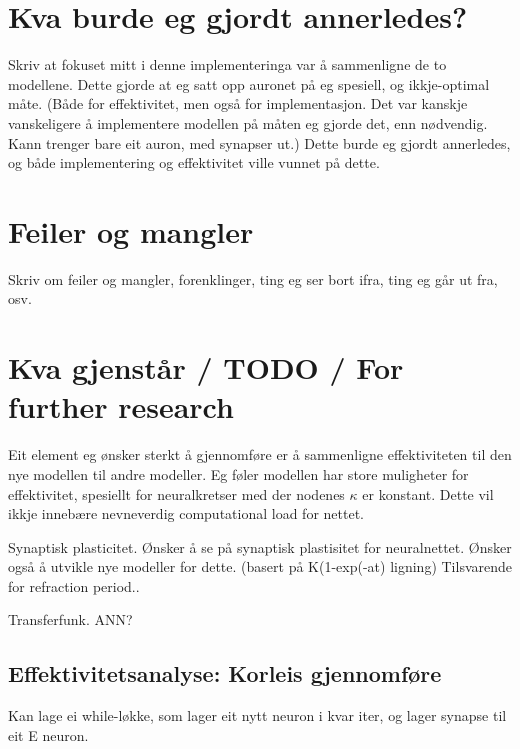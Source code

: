 \section{Kva burde eg gjordt annerledes?}
Skriv at fokuset mitt i denne implementeringa var å sammenligne de to modellene. Dette gjorde at eg satt opp auronet på eg spesiell, og ikkje-optimal måte.
(Både for effektivitet, men også for implementasjon. Det var kanskje vanskeligere å implementere modellen på måten eg gjorde det, enn nødvendig. Kann trenger bare eit auron, med synapser ut.)
Dette burde eg gjordt annerledes, og både implementering og effektivitet ville vunnet på dette.


\section{Feiler og mangler}
Skriv om feiler og mangler, forenklinger, ting eg ser bort ifra, ting eg går ut fra, osv.

%
%

\section{Kva gjenstår / TODO / For further research}
Eit element eg ønsker sterkt å gjennomføre er å sammenligne effektiviteten til den nye modellen til andre modeller. Eg føler modellen har store muligheter for effektivitet, spesiellt for neuralkretser med der nodenes $\kappa$ er konstant.
Dette vil ikkje innebære nevneverdig computational load for nettet.

Synaptisk plasticitet. Ønsker å se på synaptisk plastisitet for neuralnettet.
Ønsker også å utvikle nye modeller for dette. (basert på K(1-exp(-at) ligning)
Tilsvarende for refraction period..

Transferfunk. ANN?

\subsection{Effektivitetsanalyse: Korleis gjennomføre}
Kan lage ei while-løkke, som lager eit nytt neuron i kvar iter, og lager synapse til eit E neuron.

